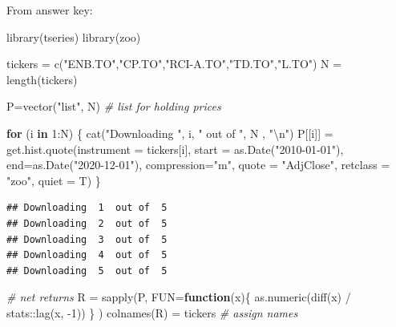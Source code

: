 \documentclass[
  oneside]{book}
\newenvironment{Shaded}{\begin{snugshade}}{\end{snugshade}}
\newcommand{\AttributeTok}[1]{\textcolor[rgb]{0.77,0.63,0.00}{#1}}
\newcommand{\CommentTok}[1]{\textcolor[rgb]{0.56,0.35,0.01}{\textit{#1}}}
\newcommand{\ControlFlowTok}[1]{\textcolor[rgb]{0.13,0.29,0.53}{\textbf{#1}}}
\newcommand{\DecValTok}[1]{\textcolor[rgb]{0.00,0.00,0.81}{#1}}
\newcommand{\FunctionTok}[1]{\textcolor[rgb]{0.00,0.00,0.00}{#1}}
\newcommand{\NormalTok}[1]{#1}
\newcommand{\OtherTok}[1]{\textcolor[rgb]{0.56,0.35,0.01}{#1}}
\newcommand{\SpecialCharTok}[1]{\textcolor[rgb]{0.00,0.00,0.00}{#1}}
\newcommand{\StringTok}[1]{\textcolor[rgb]{0.31,0.60,0.02}{#1}}
\begin{document}
From answer key:

\begin{Shaded}
\begin{Highlighting}[]
\FunctionTok{library}\NormalTok{(tseries)}
\FunctionTok{library}\NormalTok{(zoo)}

\NormalTok{tickers }\OtherTok{=} \FunctionTok{c}\NormalTok{(}\StringTok{"ENB.TO"}\NormalTok{,}\StringTok{"CP.TO"}\NormalTok{,}\StringTok{"RCI{-}A.TO"}\NormalTok{,}\StringTok{"TD.TO"}\NormalTok{,}\StringTok{"L.TO"}\NormalTok{)}
\NormalTok{N }\OtherTok{=} \FunctionTok{length}\NormalTok{(tickers)}

\NormalTok{P}\OtherTok{=}\FunctionTok{vector}\NormalTok{(}\StringTok{"list"}\NormalTok{, N) }\CommentTok{\# list for holding prices}

\ControlFlowTok{for}\NormalTok{ (i }\ControlFlowTok{in} \DecValTok{1}\SpecialCharTok{:}\NormalTok{N) \{}
  \FunctionTok{cat}\NormalTok{(}\StringTok{"Downloading "}\NormalTok{, i, }\StringTok{" out of "}\NormalTok{, N , }\StringTok{"}\SpecialCharTok{\textbackslash{}n}\StringTok{"}\NormalTok{)}
\NormalTok{  P[[i]] }\OtherTok{=} \FunctionTok{get.hist.quote}\NormalTok{(}\AttributeTok{instrument =}\NormalTok{ tickers[i], }
    \AttributeTok{start =} \FunctionTok{as.Date}\NormalTok{(}\StringTok{"2010{-}01{-}01"}\NormalTok{), }
    \AttributeTok{end=}\FunctionTok{as.Date}\NormalTok{(}\StringTok{"2020{-}12{-}01"}\NormalTok{), }
    \AttributeTok{compression=}\StringTok{"m"}\NormalTok{, }\AttributeTok{quote =} \StringTok{"AdjClose"}\NormalTok{, }
    \AttributeTok{retclass =} \StringTok{"zoo"}\NormalTok{, }\AttributeTok{quiet =}\NormalTok{ T)}
\NormalTok{\}}
\end{Highlighting}
\end{Shaded}

\begin{verbatim}
## Downloading  1  out of  5 
## Downloading  2  out of  5 
## Downloading  3  out of  5 
## Downloading  4  out of  5 
## Downloading  5  out of  5
\end{verbatim}

\begin{Shaded}
\begin{Highlighting}[]
\CommentTok{\# net returns}
\NormalTok{R }\OtherTok{=} \FunctionTok{sapply}\NormalTok{(P, }\AttributeTok{FUN=}\ControlFlowTok{function}\NormalTok{(x)\{ }\FunctionTok{as.numeric}\NormalTok{(}\FunctionTok{diff}\NormalTok{(x) }\SpecialCharTok{/}\NormalTok{ stats}\SpecialCharTok{::}\FunctionTok{lag}\NormalTok{(x, }\SpecialCharTok{{-}}\DecValTok{1}\NormalTok{)) \} )}
\FunctionTok{colnames}\NormalTok{(R) }\OtherTok{=}\NormalTok{ tickers }\CommentTok{\# assign names}
\end{Highlighting}
\end{Shaded}
\end{document}
